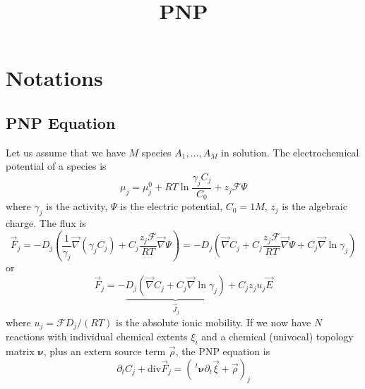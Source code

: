 \documentclass{revtex4}
\newcommand{\trn}{\!\!~^t}
\begin{document}
	\title{PNP}
	\maketitle
	
\section{Notations}
\subsection{PNP Equation}
Let us assume that we have $M$ species $A_1,\ldots,A_M$ in solution.
The electrochemical potential of a species is
\begin{equation}
	\mu_j = \mu^{0}_j + RT \ln \dfrac{\gamma_jC_j}{C_0} + z_j\mathcal{F}\Psi
\end{equation}
where $\gamma_j$ is the activity, $\Psi$ is the electric potential, $C_0=1M$, $z_j$ is the algebraic charge.
The flux is
\begin{equation}
	\vec{F}_j = -D_j 
	\left( 
		\dfrac{1}{\gamma_j} \vec{\nabla} \left( \gamma_j C_j \right) + 
		C_j \dfrac{z_j\mathcal{F}}{RT} \vec{\nabla}\Psi 
	\right)
	=
	 -D_j 
	\left( 
		\vec{\nabla}  C_j  + 
		C_j \dfrac{z_j\mathcal{F}}{RT} \vec{\nabla}\Psi + C_j \vec{\nabla} \ln \gamma_j
	\right)
\end{equation}
or
\begin{equation}
	\vec{F}_j = - \underbrace{D_j\left( \vec{\nabla} C_j + C_j \vec{\nabla} \ln \gamma_j \right)}_{\vec{J}_j} + C_j z_j u_j \vec{E}
\end{equation}
where $u_j = \mathcal{F}D_j/(RT)$ is the absolute ionic mobility.
If we now have $N$ reactions with individual chemical extents $\xi_i$ and
a chemical (univocal) topology matrix $\pmb{\nu}$, plus an extern source term $\vec{\rho}$, the PNP equation is
\begin{equation}
	\partial_t C_j + \mathrm{div}\vec{F}_j = \left(\trn\pmb{\nu} \partial_t \vec{\xi} + \vec{\rho}\right)_j
\end{equation}
\end{document}
